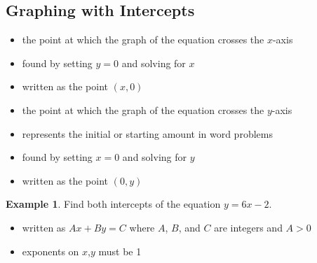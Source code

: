\documentclass[addpoints,12pt]{exam}
\theoremstyle{definition}
\theoremstyle{break}
\theoremstyle{break}
\newtheorem{example}{Example}[subsection]
\begin{document}
\setcounter{section}{3}
\setcounter{subsection}{1}

\subsection{Graphing with Intercepts}

\vspace{.15in}

\begin{definition}[$x$-intercept]
\;
\begin{itemize}
\item the point at which the graph of the equation crosses the $x$-axis
\item found by setting $y=0$ and solving for $x$
\item written as the point $(x,0)$
\end{itemize}
\end{definition}
\vspace{.15in}

\begin{definition}[$y$-intercept]
\;
\begin{itemize}
\item the point at which the graph of the equation crosses the $y$-axis
\item represents the initial or starting amount in word problems
\item found by setting $x=0$ and solving for $y$
\item written as the point $(0,y)$
\end{itemize}
\end{definition}
\vspace{.15in}

\begin{example}
Find both intercepts of the equation $y=6x-2$.
\end{example}

\newpage

\begin{definition}
\;
\begin{itemize}
\item written as $Ax + By = C$ where $A$, $B$, and $C$ are integers and $A>0$
\item exponents on $x$,$y$ must be 1
\end{itemize}
\end{definition}

\vspace{.15in}
\end{document}
